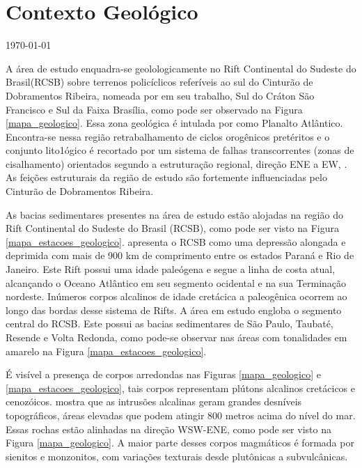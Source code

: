 \chapter{Contexto Geológico}
\today

A área de estudo enquadra-se geolologicamente no Rift Continental do Sudeste do Brasil(RCSB) sobre terrenos policíclicos referíveis ao sul do Cinturão de Dobramentos Ribeira, nomeada por \cite{Riccomini_1989} em seu trabalho, Sul do Cráton São Francisco e Sul da Faixa Brasília, como pode ser observado na Figura \ref{mapa_geologico}. Essa zona geológica é intulada por \cite{Almeida_Carneiro_1998} como Planalto Atlântico. Encontra-se nessa região retrabalhamento de ciclos orogênicos pretéritos e o conjunto lito1ógico é recortado por um sistema de falhas transcorrentes (zonas de cisalhamento) orientados segundo a estruturação regional, direção ENE a EW, \cite{Hasui_Sadowski_1976}. As feições estruturais da região de estudo são fortemente influenciadas pelo Cinturão de Dobramentos Ribeira.

As bacias sedimentares presentes na área de estudo estão alojadas na região do Rift Continental do Sudeste do Brasil (RCSB), como pode ser visto na Figura \ref{mapa_estacoes_geologico}. \cite{Riccomini_1989} apresenta o RCSB como uma depressão alongada e deprimida com mais de 900 km de comprimento entre os estados Paraná e Rio de Janeiro. Este Rift possui uma idade paleógena e segue a linha de costa atual, alcançando o Oceano Atlântico em seu segmento ocidental e na sua Terminação nordeste. Inúmeros corpos alcalinos de idade cretácica a paleogênica ocorrem ao longo das bordas desse sistema de Rifts. A área em estudo engloba o segmento central do RCSB. Este possui as bacias sedimentares de São Paulo, Taubaté, Resende e Volta Redonda, como pode-se observar nas áreas com tonalidades em amarelo na Figura \ref{mapa_estacoes_geologico}. 

É visível a presença de corpos arredondas nas Figuras \ref{mapa_geologico} e \ref{mapa_estacoes_geologico}, tais corpos representam plútons alcalinos cretácicos e cenozóicos. \cite{MOTA_2012} mostra que as intrusões alcalinas geram grandes desníveis topográficos, áreas elevadas que podem atingir 800 metros acima do nível do mar. Essas rochas estão alinhadas na direção WSW-ENE, como pode ser visto na Figura \ref{mapa_geologico}. A maior parte desses corpos magmáticos é formada por sienitos e monzonitos, com variações texturais desde plutônicas a subvulcânicas.

